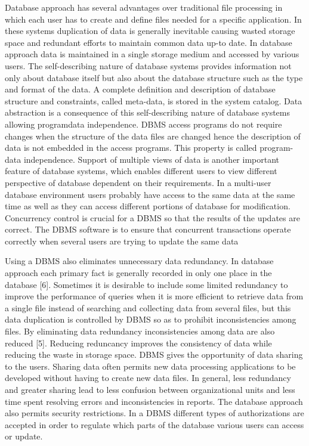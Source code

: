 Database approach has several advantages over traditional file processing
in which each user has to create and define files needed for a specific application.
In these systems duplication of data is generally inevitable causing wasted storage
space and redundant efforts to maintain common data up-to date. In database
approach data is maintained in a single storage medium and accessed by various
users. The self-describing nature of database systems provides information not
only about database itself but also about the database structure such as the type and
format of the data. A complete definition and description of database structure and
constraints, called meta-data, is stored in the system catalog. Data abstraction is a
consequence of this self-describing nature of database systems allowing programdata independence. DBMS access programs do not require changes when the
structure of the data files are changed hence the description of data is not
embedded in the access programs. This property is called program-data
independence. Support of multiple views of data is another important feature of
database systems, which enables different users to view different perspective of
database dependent on their requirements. In a multi-user database environment
users probably have access to the same data at the same time as well as they can
access different portions of database for modification. Concurrency control is
crucial for a DBMS so that the results of the updates are correct. The DBMS
software is to ensure that concurrent transactions operate correctly when several
users are trying to update the same data

Using a DBMS also eliminates unnecessary data redundancy. In database
approach each primary fact is generally recorded in only one place in the database
[6]. Sometimes it is desirable to include some limited redundancy to improve the
performance of queries when it is more efficient to retrieve data from a single file
instead of searching and collecting data from several files, but this data duplication
is controlled by DBMS so as to prohibit inconsistencies among files. By
eliminating data redundancy inconsistencies among data are also reduced [5].
Reducing reduncancy improves the consistency of data while reducing the waste
in storage space. DBMS gives the opportunity of data sharing to the users. Sharing
data often permits new data processing applications to be developed without
having to create new data files. In general, less redundancy and greater sharing
lead to less confusion between organizational units and less time spent resolving
errors and inconsistencies in reports. The database approach also permits security
restrictions. In a DBMS different types of authorizations are accepted in order to
regulate which parts of the database various users can access or update. 